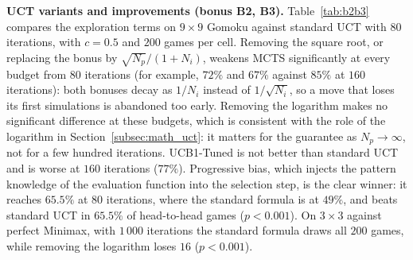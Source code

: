 \begin{table}[t]
\centering
\caption{T5: Non-loss rate against perfect Minimax ($3\times 3$) and win rate against MCTS with $60$ iterations ($9\times 9$), in percent, $200$ games per cell}
\label{tab:t5}
\resizebox{\columnwidth}{!}{}
\end{table}

\textbf{UCT variants and improvements (bonus B2, B3).} Table~\ref{tab:b2b3} compares the exploration terms on $9\times 9$ Gomoku against standard UCT with $80$ iterations, with $c = 0.5$ and $200$ games per cell. Removing the square root, or replacing the bonus by $\sqrt{N_p}/(1+N_i)$, weakens MCTS significantly at every budget from $80$ iterations (for example, $72\%$ and $67\%$ against $85\%$ at $160$ iterations): both bonuses decay as $1/N_i$ instead of $1/\sqrt{N_i}$, so a move that loses its first simulations is abandoned too early. Removing the logarithm makes no significant difference at these budgets, which is consistent with the role of the logarithm in Section~\ref{subsec:math_uct}: it matters for the guarantee as $N_p \to \infty$, not for a few hundred iterations. UCB1-Tuned is not better than standard UCT and is worse at $160$ iterations ($77\%$). Progressive bias, which injects the pattern knowledge of the evaluation function into the selection step, is the clear winner: it reaches $65.5\%$ at $80$ iterations, where the standard formula is at $49\%$, and beats standard UCT in $65.5\%$ of head-to-head games ($p < 0.001$). On $3\times 3$ against perfect Minimax, with $1\,000$ iterations the standard formula draws all $200$ games, while removing the logarithm loses $16$ ($p < 0.001$).

\begin{table}[t]
\centering
\caption{B2/B3: Win rate (\%) of UCT variants on $9\times 9$ Gomoku against standard UCT with $80$ iterations; $^{*}$ marks a significant difference from the standard formula at the same budget ($p < 0.05$)}
\label{tab:b2b3}
\resizebox{\columnwidth}{!}{}
\end{table}
